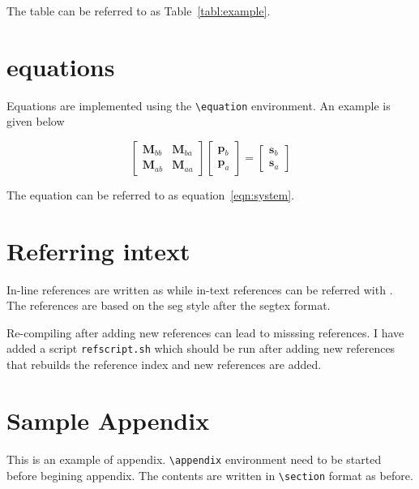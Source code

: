 \documentclass{edger}
\begin{document}
The table can be referred to as Table~\ref{tabl:example}. 

\lipsum[1-7]  
\section*{equations}

Equations are implemented using the \verb|\equation| environment. An example is given below

\begin{equation}
\begin{bmatrix}
\mathbf{M}_{bb} & \mathbf{M}_{ba} \\
\mathbf{M}_{ab} & \mathbf{M}_{aa}
\end{bmatrix}
\begin{bmatrix}
\mathbf{p}_{b}  \\
\mathbf{p}_{a} 
\end{bmatrix}
=
\begin{bmatrix}
\mathbf{s}_{b}  \\
\mathbf{s}_{a} 
\end{bmatrix}
\label{eqn:system}
\end{equation}

The equation can be referred to as equation~\ref{eqn:system}.

\lipsum[1-7]  

\section*{Referring intext}
In-line references are written as \cite{knuth1989} while in-text references can be referred with \cite[]{lamport}. The references are based on the seg style after the segtex format.

Re-compiling after adding new references can lead to misssing references. I have added a script \verb|refscript.sh| which should be run after adding new references that rebuilds the reference index and new references are added. 




\newpage




\appendix %

\section{Sample Appendix} 

This is an example of appendix. \verb|\appendix| environment need to be started before begining appendix. The contents are written in \verb|\section| format as before.
\end{document}
